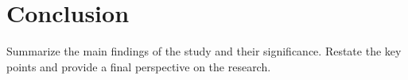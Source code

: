 \section{Conclusion}
\label{sec:conclusion}

Summarize the main findings of the study and their significance. Restate the key points and provide a final perspective on the research.


